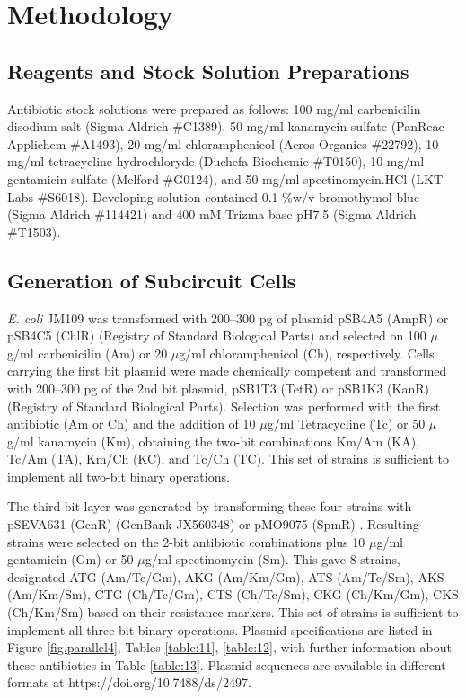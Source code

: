 \section{Methodology}

\subsection{Reagents and Stock Solution Preparations}

Antibiotic stock solutions were prepared as follows: 100 mg/ml carbenicilin disodium salt (Sigma-Aldrich \#C1389), 50 mg/ml kanamycin sulfate (PanReac Applichem \#A1493), 20 mg/ml chloramphenicol (Acros Organics \#22792), 10 mg/ml tetracycline hydrochloryde (Duchefa Biochemie \#T0150), 10 mg/ml gentamicin sulfate (Melford \#G0124), and 50 mg/ml spectinomycin.HCl (LKT Labs \#S6018). Developing solution contained 0.1 \%w/v bromothymol blue (Sigma-Aldrich \#114421) and 400 mM Trizma base pH7.5 (Sigma-Aldrich \#T1503).

\subsection{Generation of Subcircuit Cells}

\textit{E. coli} JM109 was transformed with 200–300 pg of plasmid pSB4A5 (AmpR) or pSB4C5 (ChlR) (Registry of Standard Biological Parts) and selected on 100 $\mu$g/ml carbenicilin (Am) or 20 $\mu$g/ml chloramphenicol (Ch), respectively. Cells carrying the first bit plasmid were made chemically competent \citep{chung1989one} and transformed with 200–300 pg of the 2nd bit plasmid, pSB1T3 (TetR) or pSB1K3 (KanR) (Registry of Standard Biological Parts). Selection was performed with the first antibiotic (Am or Ch) and the addition of 10 $\mu$g/ml Tetracycline (Tc) or 50 $\mu$g/ml kanamycin (Km), obtaining the two-bit combinations Km/Am (KA), Tc/Am (TA), Km/Ch (KC), and Tc/Ch (TC). This set of strains is sufficient to implement all two-bit binary operations.

The third bit layer was generated by transforming these four strains with pSEVA631 (GenR) \citep{silva2012standard} (GenBank JX560348) or pMO9075 (SpmR) \citep{keller2011methods}. Resulting strains were selected on the 2-bit antibiotic combinations plus 10 $\mu$g/ml gentamicin (Gm) or 50 $\mu$g/ml spectinomycin (Sm). This gave 8 strains, designated ATG (Am/Tc/Gm), AKG (Am/Km/Gm), ATS (Am/Tc/Sm), AKS (Am/Km/Sm), CTG (Ch/Tc/Gm), CTS (Ch/Tc/Sm), CKG (Ch/Km/Gm), CKS (Ch/Km/Sm) based on their resistance markers. This set of strains is sufficient to implement all three-bit binary operations. Plasmid specifications are listed in Figure \ref{fig.parallel4}, Tables \ref{table:11}, \ref{table:12}, with further information about these antibiotics in Table \ref{table:13}. Plasmid sequences are available in different formats at https://doi.org/10.7488/ds/2497.

